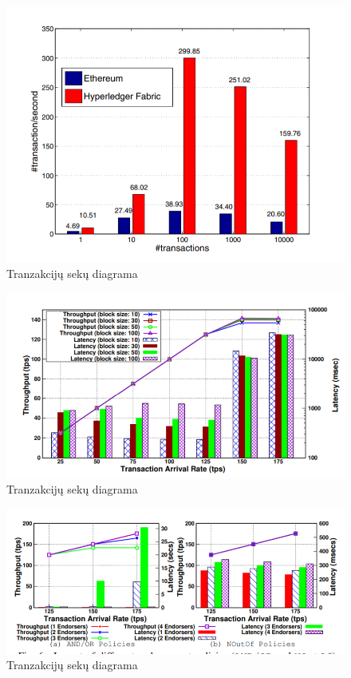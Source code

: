 \documentclass{VUMIFPSkursinis}
\begin{document}
\begin{figure}[H]
    \centering
    \includegraphics[scale=0.5]{img/One}
    \caption{Tranzakcijų sekų diagrama}   %
    \label{img:mlp}
\end{figure}
\begin{figure}[H]
    \centering
    \includegraphics[scale=0.7]{img/OneVelavimas}
    \caption{Tranzakcijų sekų diagrama}   %
    \label{img:mlp}
\end{figure}
\begin{figure}[H]
    \centering
    \includegraphics[scale=0.7]{img/PraeinamumasPolicy}
    \caption{Tranzakcijų sekų diagrama}   %
    \label{img:mlp}
\end{figure}
\end{document}
